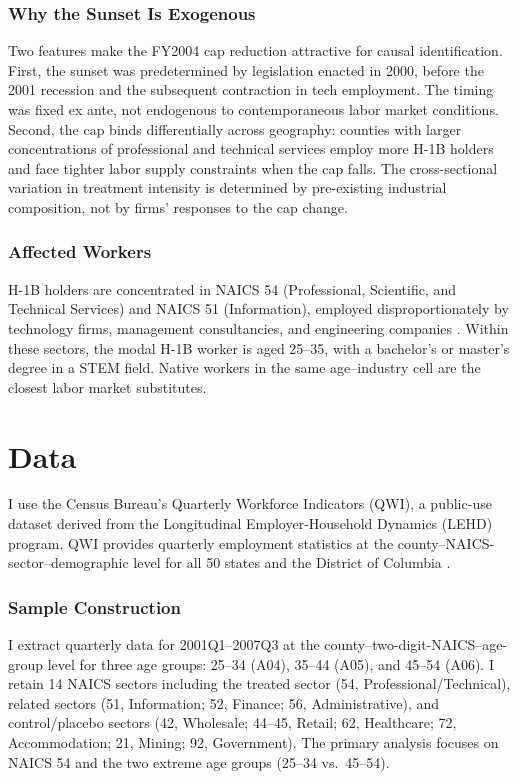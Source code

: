 \documentclass[12pt]{article}
\begin{document}
\subsubsection*{Why the Sunset Is Exogenous} Two features make the FY2004 cap reduction attractive for causal identification. First, the sunset was predetermined by legislation enacted in 2000, before the 2001 recession and the subsequent contraction in tech employment. The timing was fixed ex ante, not endogenous to contemporaneous labor market conditions. Second, the cap binds differentially across geography: counties with larger concentrations of professional and technical services employ more H-1B holders and face tighter labor supply constraints when the cap falls. The cross-sectional variation in treatment intensity is determined by pre-existing industrial composition, not by firms' responses to the cap change.

\subsubsection*{Affected Workers} H-1B holders are concentrated in NAICS 54 (Professional, Scientific, and Technical Services) and NAICS 51 (Information), employed disproportionately by technology firms, management consultancies, and engineering companies \citep{bound2017understanding}. Within these sectors, the modal H-1B worker is aged 25--35, with a bachelor's or master's degree in a STEM field. Native workers in the same age--industry cell are the closest labor market substitutes.

\section{Data}

I use the Census Bureau's Quarterly Workforce Indicators (QWI), a public-use dataset derived from the Longitudinal Employer-Household Dynamics (LEHD) program. QWI provides quarterly employment statistics at the county--NAICS-sector--demographic level for all 50 states and the District of Columbia \citep{abowd2009lehd}.

\subsubsection*{Sample Construction} I extract quarterly data for 2001Q1--2007Q3 at the county--two-digit-NAICS--age-group level for three age groups: 25--34 (A04), 35--44 (A05), and 45--54 (A06). I retain 14 NAICS sectors including the treated sector (54, Professional/Technical), related sectors (51, Information; 52, Finance; 56, Administrative), and control/placebo sectors (42, Wholesale; 44--45, Retail; 62, Healthcare; 72, Accommodation; 21, Mining; 92, Government). The primary analysis focuses on NAICS 54 and the two extreme age groups (25--34 vs.\ 45--54).
\end{document}
